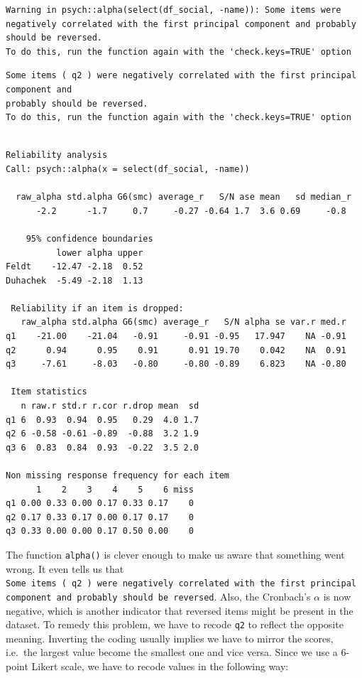 \documentclass[
  letterpaper,
  DIV=11,
  numbers=noendperiod]{scrreprt}
\begin{document}
\begin{verbatim}
Warning in psych::alpha(select(df_social, -name)): Some items were negatively correlated with the first principal component and probably 
should be reversed.  
To do this, run the function again with the 'check.keys=TRUE' option
\end{verbatim}

\begin{verbatim}
Some items ( q2 ) were negatively correlated with the first principal component and 
probably should be reversed.  
To do this, run the function again with the 'check.keys=TRUE' option
\end{verbatim}

\begin{verbatim}

Reliability analysis   
Call: psych::alpha(x = select(df_social, -name))

  raw_alpha std.alpha G6(smc) average_r   S/N ase mean   sd median_r
      -2.2      -1.7     0.7     -0.27 -0.64 1.7  3.6 0.69     -0.8

    95% confidence boundaries 
          lower alpha upper
Feldt    -12.47 -2.18  0.52
Duhachek  -5.49 -2.18  1.13

 Reliability if an item is dropped:
   raw_alpha std.alpha G6(smc) average_r   S/N alpha se var.r med.r
q1    -21.00    -21.04   -0.91     -0.91 -0.95   17.947    NA -0.91
q2      0.94      0.95    0.91      0.91 19.70    0.042    NA  0.91
q3     -7.61     -8.03   -0.80     -0.80 -0.89    6.823    NA -0.80

 Item statistics 
   n raw.r std.r r.cor r.drop mean  sd
q1 6  0.93  0.94  0.95   0.29  4.0 1.7
q2 6 -0.58 -0.61 -0.89  -0.88  3.2 1.9
q3 6  0.83  0.84  0.93  -0.22  3.5 2.0

Non missing response frequency for each item
      1    2    3    4    5    6 miss
q1 0.00 0.33 0.00 0.17 0.33 0.17    0
q2 0.17 0.33 0.17 0.00 0.17 0.17    0
q3 0.33 0.00 0.00 0.17 0.50 0.00    0
\end{verbatim}

The function \texttt{alpha()} is clever enough to make us aware that
something went wrong. It even tells us that
\texttt{Some\ items\ (\ q2\ )\ were\ negatively\ correlated\ with\ the\ first\ principal\ component\ and\ probably\ should\ be\ reversed}.
Also, the Cronbach's \(\alpha\) is now negative, which is another
indicator that reversed items might be present in the dataset. To remedy
this problem, we have to recode \texttt{q2} to reflect the opposite
meaning. Inverting the coding usually implies we have to mirror the
scores, i.e.~the largest value become the smallest one and vice versa.
Since we use a 6-point Likert scale, we have to recode values in the
following way:
\end{document}
